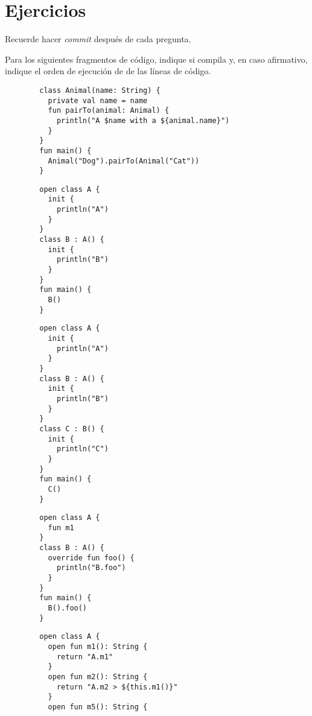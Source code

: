\newpage
\section{Ejercicios}
  \label{sec:oop:principios:ejercicios}
  \begin{important}
    Recuerde hacer \textit{commit} después de cada pregunta.
  \end{important}

  \begin{Exercise}[title={Orden de ejecución}]
    Para los siguientes fragmentos de código, indique si compila y, en caso afirmativo, indique el
    orden de ejecución de de las líneas de código.
    
    \Question 
      \begin{verbatim}
        class Animal(name: String) {
          private val name = name
          fun pairTo(animal: Animal) {
            println("A $name with a ${animal.name}")
          }
        }
        fun main() {
          Animal("Dog").pairTo(Animal("Cat"))
        }
      \end{verbatim}
    \Question 
      \begin{verbatim}
        open class A {
          init {
            println("A")
          }
        }
        class B : A() {
          init {
            println("B")
          }
        }
        fun main() {
          B()
        }
      \end{verbatim}
    \Question 
      \begin{verbatim}
        open class A {
          init {
            println("A")
          }
        }
        class B : A() {
          init {
            println("B")
          }
        }
        class C : B() {
          init {
            println("C")
          }
        }
        fun main() {
          C()
        }
      \end{verbatim}
    \Question 
      \begin{verbatim}
        open class A {
          fun m1
        }
        class B : A() {
          override fun foo() {
            println("B.foo")
          }
        }
        fun main() {
          B().foo()
        }
      \end{verbatim}
    \Question
      \begin{verbatim}
        open class A {
          open fun m1(): String {
            return "A.m1"
          }
          open fun m2(): String {
            return "A.m2 > ${this.m1()}"
          }
          open fun m5(): String {

\end{verbatim}
\end{Exercise}
